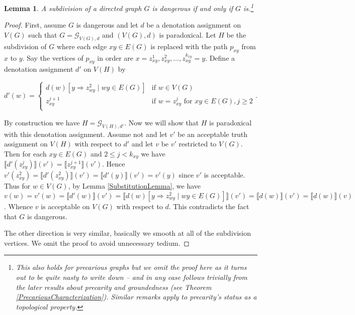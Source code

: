 \documentclass[12pt]{article}
\newtheorem{lem}[thm]{Lemma}
\theoremstyle{remark}
\newcommand{\fancy}[1]{\mathcal{#1}}
\def\G{\fancy{G}}
\begin{document}
\begin{lem}\label{SubdivisionLemma}
A subdivision of a directed graph $G$ is dangerous if and only if $G$ is.\footnote{This also holds for precarious graphs but we omit the proof here as it turns out to be quite nasty to write down -- and in any case follows trivially from the later results about precarity and groundedness (see Theorem \ref{PrecariousCharacterization}). Similar remarks apply to precarity's status as a topological property.}
\end{lem}
\begin{proof}
First, assume $G$ is dangerous and let $d$ be a denotation assignment on $V(G)$ such that $G = \G_{V(G), d}$ and $(V(G), d)$ is paradoxical.  Let $H$ be the subdivision of $G$ where each edge $xy \in E(G)$ is replaced with the path $p_{xy}$ from $x$ to $y$.  Say the vertices of $p_{xy}$ in order are $x = z_{xy}^1, z_{xy}^2, \ldots, z_{xy}^{k_{xy}} = y$.  Define a denotation assignment $d'$ on $V(H)$ by

\[d'(w) = \begin{cases}
d(w)[y \Rightarrow z_{wy}^2 \mid wy \in E(G)] & \text{if } w \in V(G) \\
z_{xy}^{j+1} & \text{if } w = z_{xy}^j \text{ for } xy \in E(G), j \geq 2 \\
\end{cases}.\]

By construction we have $H = \G_{V(H), d'}$.  Now we will show that $H$ is paradoxical with this denotation assignment.  Assume not and let $v'$ be an acceptable truth assignment on $V(H)$ with respect to $d'$ and let $v$ be $v'$ restricted to $V(G)$. Then for each $xy \in E(G)$ and $2 \leq j < k_{xy}$ we have $\llbracket d'(z_{xy}^j) \rrbracket(v') = \llbracket z_{xy}^{j + 1} \rrbracket(v')$.  Hence $v'(z_{xy}^2) = \llbracket d'(z_{xy}^2) \rrbracket(v') = \llbracket d'(y) \rrbracket(v') = v'(y)$ since $v'$ is acceptable.  Thus for $w \in V(G)$, by Lemma \ref{SubstitutionLemma}, we have $v(w) = v'(w) = \llbracket d'(w) \rrbracket(v') = \llbracket d(w)[y \Rightarrow z_{wy}^2 \mid wy \in E(G)] \rrbracket(v') = \llbracket d(w) \rrbracket(v') = \llbracket d(w) \rrbracket(v)$.  Whence $v$ is acceptable on $V(G)$ with respect to $d$.  This contradicts the fact that $G$ is dangerous.\newline

The other direction is very similar, basically we smooth at all of the subdivision vertices.  We omit the proof to avoid unnecessary tedium.
\end{proof}
\end{document}
